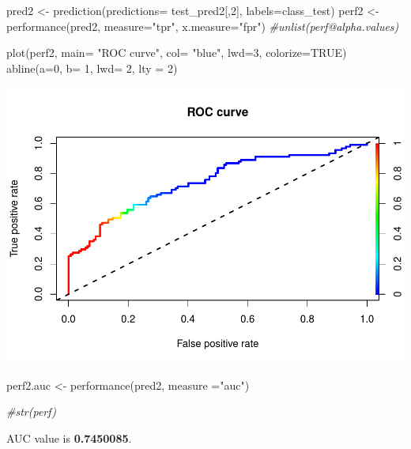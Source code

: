 \documentclass[
]{article}
\newenvironment{Shaded}{\begin{snugshade}}{\end{snugshade}}
\newcommand{\AttributeTok}[1]{\textcolor[rgb]{0.77,0.63,0.00}{#1}}
\newcommand{\CommentTok}[1]{\textcolor[rgb]{0.56,0.35,0.01}{\textit{#1}}}
\newcommand{\ConstantTok}[1]{\textcolor[rgb]{0.00,0.00,0.00}{#1}}
\newcommand{\DecValTok}[1]{\textcolor[rgb]{0.00,0.00,0.81}{#1}}
\newcommand{\FunctionTok}[1]{\textcolor[rgb]{0.00,0.00,0.00}{#1}}
\newcommand{\NormalTok}[1]{#1}
\newcommand{\OtherTok}[1]{\textcolor[rgb]{0.56,0.35,0.01}{#1}}
\newcommand{\StringTok}[1]{\textcolor[rgb]{0.31,0.60,0.02}{#1}}
\begin{document}
\begin{Shaded}
\begin{Highlighting}[]
\NormalTok{pred2 }\OtherTok{\textless{}{-}} \FunctionTok{prediction}\NormalTok{(}\AttributeTok{predictions=}\NormalTok{ test\_pred2[,}\DecValTok{2}\NormalTok{], }\AttributeTok{labels=}\NormalTok{class\_test)}
\NormalTok{perf2 }\OtherTok{\textless{}{-}} \FunctionTok{performance}\NormalTok{(pred2, }\AttributeTok{measure=}\StringTok{"tpr"}\NormalTok{, }\AttributeTok{x.measure=}\StringTok{"fpr"}\NormalTok{)}
\CommentTok{\#unlist(perf@alpha.values)}


\FunctionTok{plot}\NormalTok{(perf2, }\AttributeTok{main=} \StringTok{"ROC curve"}\NormalTok{, }\AttributeTok{col=} \StringTok{"blue"}\NormalTok{, }\AttributeTok{lwd=}\DecValTok{3}\NormalTok{, }\AttributeTok{colorize=}\ConstantTok{TRUE}\NormalTok{)}
\FunctionTok{abline}\NormalTok{(}\AttributeTok{a=}\DecValTok{0}\NormalTok{, }\AttributeTok{b=} \DecValTok{1}\NormalTok{, }\AttributeTok{lwd=} \DecValTok{2}\NormalTok{, }\AttributeTok{lty =} \DecValTok{2}\NormalTok{)}
\end{Highlighting}
\end{Shaded}

\includegraphics{naive_bayes_laura_files/figure-latex/unnamed-chunk-18-1.pdf}

\begin{Shaded}
\begin{Highlighting}[]
\NormalTok{perf2.auc }\OtherTok{\textless{}{-}} \FunctionTok{performance}\NormalTok{(pred2, }\AttributeTok{measure =}\StringTok{"auc"}\NormalTok{)}


\CommentTok{\#str(perf)}
\end{Highlighting}
\end{Shaded}

AUC value is \textbf{0.7450085}.
\end{document}
